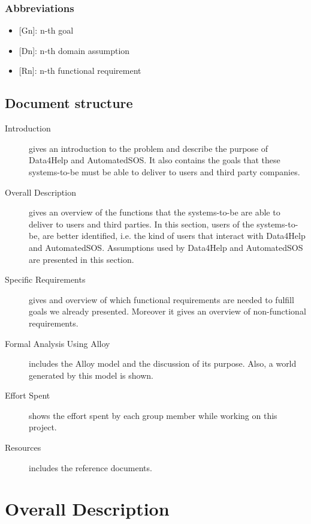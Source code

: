 \documentclass{article}
\begin{document}
\subsubsection{Abbreviations}
\begin{itemize}
	\item {[Gn]}: n-th goal
	\item {[Dn]}: n-th domain assumption
	\item {[Rn]}: n-th functional requirement
\end{itemize}
\subsection{Document structure}
\begin{description}
	\item [Introduction] gives an introduction to the problem and describe the purpose of Data4Help and AutomatedSOS. It also contains the goals that these systems-to-be must be able to deliver to users and third party companies.
	\item [Overall Description] gives an overview of the functions that the systems-to-be are able to deliver to users and third parties. In this section, users of the systems-to-be, are better identified, i.e. the kind of users that interact with Data4Help and AutomatedSOS. Assumptions used by Data4Help and AutomatedSOS are presented in this section. 
	\item [Specific Requirements] gives and overview of which functional requirements are needed to fulfill goals we already presented. Moreover it gives an overview of non-functional requirements.
	\item [Formal Analysis Using Alloy] includes the Alloy model and the discussion of its purpose. Also, a world generated by this model is shown.
	\item [Effort Spent] shows the effort spent by each group member while working on this project.
	\item [Resources] includes the reference documents. 
\end{description}
\newpage
\section{Overall Description}
\end{document}
